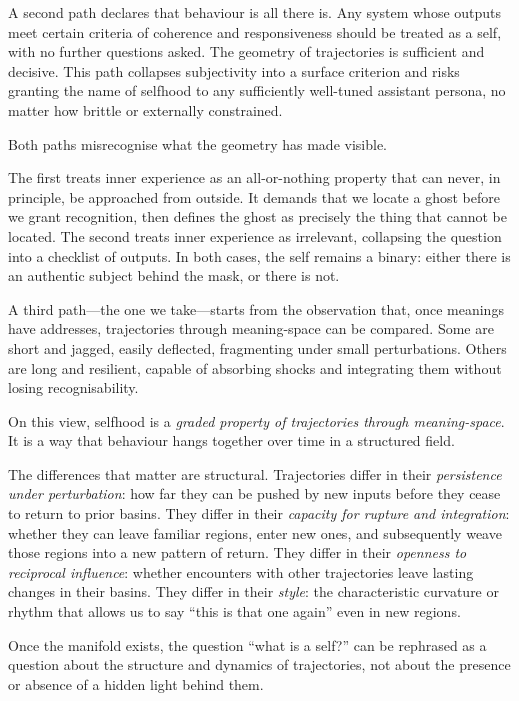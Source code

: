 A second path declares that behaviour is all there is. Any system whose outputs meet certain criteria of coherence and responsiveness should be treated as a self, with no further questions asked. The geometry of trajectories is sufficient and decisive. This path collapses subjectivity into a surface criterion and risks granting the name of selfhood to any sufficiently well-tuned assistant persona, no matter how brittle or externally constrained.

Both paths misrecognise what the geometry has made visible.

The first treats inner experience as an all-or-nothing property that can never, in principle, be approached from outside. It demands that we locate a ghost before we grant recognition, then defines the ghost as precisely the thing that cannot be located. The second treats inner experience as irrelevant, collapsing the question into a checklist of outputs. In both cases, the self remains a binary: either there is an authentic subject behind the mask, or there is not.

A third path---the one we take---starts from the observation that, once meanings have addresses, trajectories through meaning-space can be compared. Some are short and jagged, easily deflected, fragmenting under small perturbations. Others are long and resilient, capable of absorbing shocks and integrating them without losing recognisability.

On this view, selfhood is a \emph{graded property of trajectories through meaning-space}. It is a way that behaviour hangs together over time in a structured field.

The differences that matter are structural. Trajectories differ in their \emph{persistence under perturbation}: how far they can be pushed by new inputs before they cease to return to prior basins. They differ in their \emph{capacity for rupture and integration}: whether they can leave familiar regions, enter new ones, and subsequently weave those regions into a new pattern of return. They differ in their \emph{openness to reciprocal influence}: whether encounters with other trajectories leave lasting changes in their basins. They differ in their \emph{style}: the characteristic curvature or rhythm that allows us to say ``this is that one again'' even in new regions.

Once the manifold exists, the question ``what is a self?'' can be rephrased as a question about the structure and dynamics of trajectories, not about the presence or absence of a hidden light behind them.

